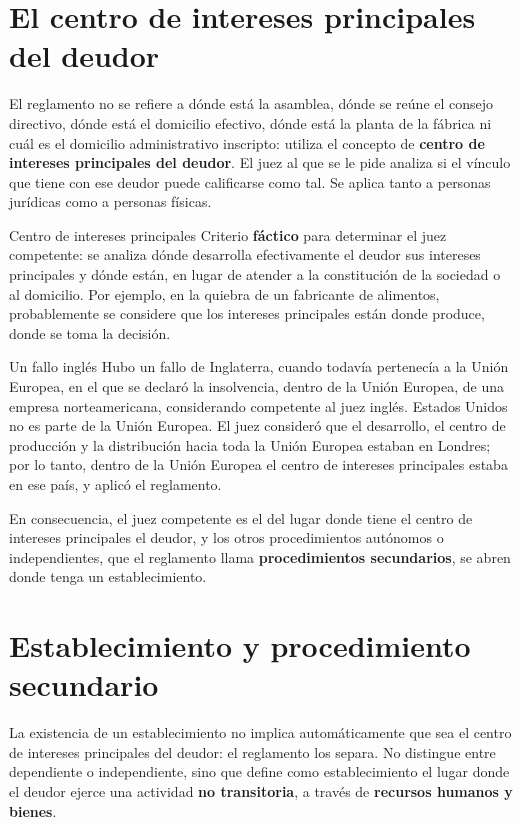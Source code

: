 \documentclass[12pt,oneside]{book}
\begin{document}
\section{El centro de intereses principales del deudor}

El reglamento no se refiere a dónde está la asamblea, dónde se reúne el consejo directivo, dónde está el domicilio efectivo, dónde está la planta de la fábrica ni cuál es el domicilio administrativo inscripto: utiliza el concepto de \textbf{centro de intereses principales del deudor}. El juez al que se le pide analiza si el vínculo que tiene con ese deudor puede calificarse como tal. Se aplica tanto a personas jurídicas como a personas físicas.

\begin{definition}{Centro de intereses principales}
Criterio \textbf{fáctico} para determinar el juez competente: se analiza dónde desarrolla efectivamente el deudor sus intereses principales y dónde están, en lugar de atender a la constitución de la sociedad o al domicilio. Por ejemplo, en la quiebra de un fabricante de alimentos, probablemente se considere que los intereses principales están donde produce, donde se toma la decisión.
\end{definition}

\begin{example}{Un fallo inglés}
Hubo un fallo de Inglaterra, cuando todavía pertenecía a la Unión Europea, en el que se declaró la insolvencia, dentro de la Unión Europea, de una empresa norteamericana, considerando competente al juez inglés. Estados Unidos no es parte de la Unión Europea. El juez consideró que el desarrollo, el centro de producción y la distribución hacia toda la Unión Europea estaban en Londres; por lo tanto, dentro de la Unión Europea el centro de intereses principales estaba en ese país, y aplicó el reglamento.
\end{example}

En consecuencia, el juez competente es el del lugar donde tiene el centro de intereses principales el deudor, y los otros procedimientos autónomos o independientes, que el reglamento llama \textbf{procedimientos secundarios}, se abren donde tenga un establecimiento.

\section{Establecimiento y procedimiento secundario}

La existencia de un establecimiento no implica automáticamente que sea el centro de intereses principales del deudor: el reglamento los separa. No distingue entre dependiente o independiente, sino que define como establecimiento el lugar donde el deudor ejerce una actividad \textbf{no transitoria}, a través de \textbf{recursos humanos y bienes}.
\end{document}
